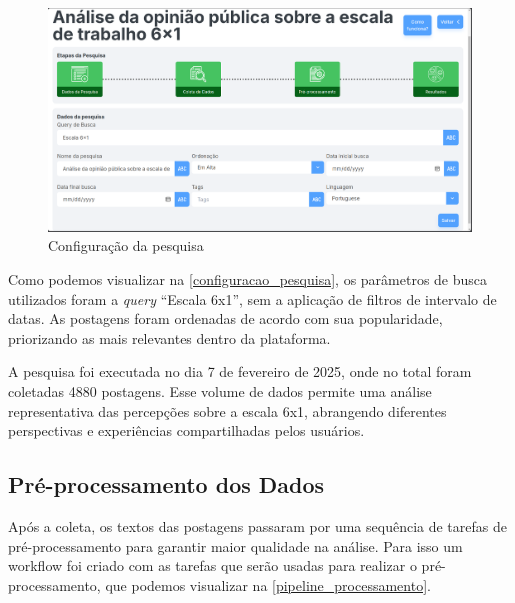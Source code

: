 \documentclass[
	12pt,				%
	oneside,			%
	a4paper,			%
	english,			%
	french,				%
	spanish,			%
	brazil				%
	]{abntex2}
\begin{document}
\begin{figure}[htbp]
\hypertarget{configuracao_pesquisa}{%
\caption{Configuração da pesquisa}\label{configuracao_pesquisa}
\begin{center}
\includegraphics[scale=0.35]{imagens/sentilytics/estudo-caso/dados_pesquisa.png}
\end{center}
}
\end{figure}

Como podemos visualizar na \autoref{configuracao_pesquisa}, os
parâmetros de busca utilizados foram a \emph{query} ``Escala 6x1'', sem
a aplicação de filtros de intervalo de datas. As postagens foram
ordenadas de acordo com sua popularidade, priorizando as mais relevantes
dentro da plataforma.

A pesquisa foi executada no dia 7 de fevereiro de 2025, onde no total
foram coletadas 4880 postagens. Esse volume de dados permite uma análise
representativa das percepções sobre a escala 6x1, abrangendo diferentes
perspectivas e experiências compartilhadas pelos usuários.

\hypertarget{pruxe9-processamento-dos-dados}{%
\subsection{Pré-processamento dos
Dados}\label{pruxe9-processamento-dos-dados}}

Após a coleta, os textos das postagens passaram por uma sequência de
tarefas de pré-processamento para garantir maior qualidade na análise.
Para isso um workflow foi criado com as tarefas que serão usadas para
realizar o pré-processamento, que podemos visualizar na
\autoref{pipeline_processamento}.
\end{document}
